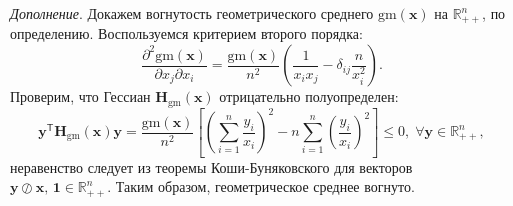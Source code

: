 \documentclass[a4paper,12pt]{article}
\begin{document}
\begin{enumerate}
\begin{enumerate}
			\textit{Дополнение}. Докажем вогнутость геометрического среднего $\text{gm}(\mathbf{x})$ на $\mathbb{R}_{++}^n$, по определению. Воспользуемся критерием второго порядка:
			\begin{equation*}
				\frac{\partial^2 \text{gm}(\mathbf{x})}{\partial x_j \partial x_i} = \frac{\text{gm}(\mathbf{x})}{n^2} \left( \frac{1}{x_i x_j} - \delta_{ij} \frac{n}{x_i^2} \right).
			\end{equation*}
			Проверим, что Гессиан $\mathbf{H}_\text{gm}(\mathbf{x})$ отрицательно полуопределен:
			\begin{equation*}
				\mathbf{y}^\mathsf{T}\mathbf{H}_\text{gm}(\mathbf{x})\mathbf{y} = \frac{\text{gm}(\mathbf{x})}{n^2} \left[ \left(\sum_{i=1}^n \frac{y_i}{x_i}\right)^2 - n \sum_{i=1}^n \left(\frac{y_i}{x_i}\right)^2 \right] \leqslant 0,\; \forall \mathbf{y}\in\mathbb{R}_{++}^n,
			\end{equation*}
			неравенство следует из теоремы Коши-Буняковского для векторов $\mathbf{y}\oslash\mathbf{x},\,\mathbf{1}\in\mathbb{R}_{++}^n$. Таким образом, геометрическое среднее вогнуто.
			
			
			
			
%			
			

\end{enumerate}
\end{enumerate}
\end{document}
